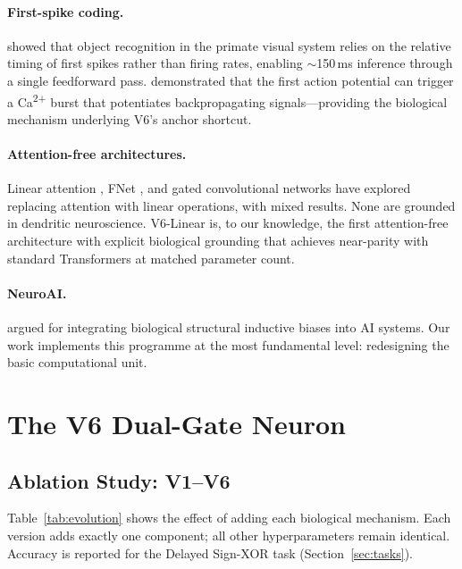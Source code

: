 \documentclass[11pt,a4paper]{article}
\begin{document}
\paragraph{First-spike coding.}
\citet{thorpe2001spike} showed that object recognition in the primate
visual system relies on the relative timing of first spikes rather than
firing rates, enabling $\sim$150\,ms inference through a single
feedforward pass.
\citet{larkum1999new} demonstrated that the first action potential can
trigger a Ca\textsuperscript{2+} burst that potentiates
backpropagating signals---providing the biological mechanism underlying V6's
anchor shortcut.

\paragraph{Attention-free architectures.}
Linear attention \citep{katharopoulos2020transformers},
FNet \citep{lee2021fnet}, and gated convolutional networks
\citep{dauphin2017language} have explored replacing attention
with linear operations, with mixed results.
None are grounded in dendritic neuroscience.
V6-Linear is, to our knowledge, the first attention-free architecture
with explicit biological grounding that achieves near-parity with
standard Transformers at matched parameter count.

\paragraph{NeuroAI.}
\citet{zador2023catalyzing} argued for integrating biological structural
inductive biases into AI systems.
Our work implements this programme at the most fundamental level:
redesigning the basic computational unit.

\section{The V6 Dual-Gate Neuron}

\subsection{Ablation Study: V1--V6}
\label{sec:ablation}

Table~\ref{tab:evolution} shows the effect of adding each biological
mechanism. Each version adds exactly one component; all other
hyperparameters remain identical. Accuracy is reported for the
Delayed Sign-XOR task (Section~\ref{sec:tasks}).
\end{document}
